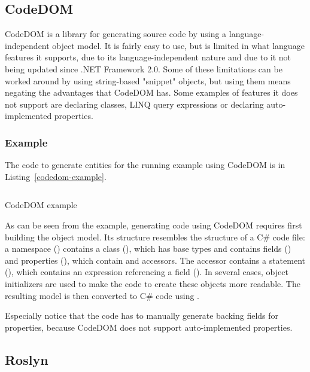\subsection{CodeDOM}

\ac{CodeDOM} \cite{codedom} is a library for generating source code by using a language-independent object model. It is fairly easy to use, but is limited in what language features it supports, due to its language-independent nature and due to it not being updated since .NET Framework 2.0. Some of these limitations can be worked around by using string-based "snippet" objects, but using them means negating the advantages that CodeDOM has. Some examples of features it does not support are declaring  classes, LINQ query expressions or declaring auto-implemented properties.

\subsubsection{Example}

The code to generate entities for the running example using CodeDOM is in Listing~\ref{codedom-example}.

\begin{listing}
\inputminted[firstline=14,lastline=61]{csharp}{samples/CodeDOM/Program.cs}
\caption{CodeDOM example}
\label{codedom-example}
\end{listing}

As can be seen from the example, generating code using \ac{CodeDOM} requires first building the object model. Its structure resembles the structure of a C\# code file: a namespace () contains a class (), which has base types and contains fields () and properties (), which contain  and  accessors. The  accessor contains a  statement (), which contains an expression referencing a field (). In several cases, object initializers are used to make the code to create these objects more readable. The resulting model is then converted to C\# code using .

Especially notice that the code has to manually generate backing fields for properties, because CodeDOM does not support auto-implemented properties.

\subsection{Roslyn}

